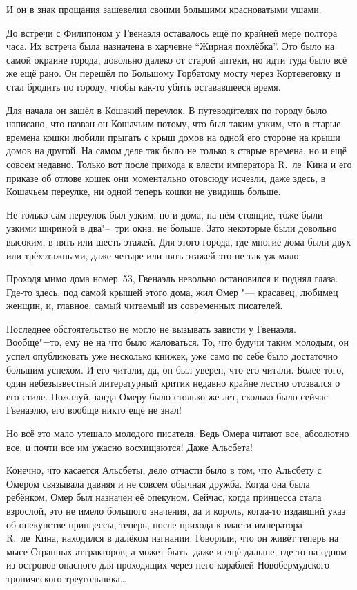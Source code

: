 И он в знак прощания зашевелил своими большими красноватыми ушами.

До встречи с Филипоном у Гвенаэля оставалось ещё по крайней мере полтора часа.
Их встреча была назначена в харчевне \enquote{Жирная похлёбка}.
Это было на самой окраине города, довольно далеко от старой аптеки, но идти туда
было всё же ещё рано.
Он перешёл по Большому Горбатому мосту через Кортевеговку и стал бродить по
городу, чтобы как-то убить остававшееся время.

Для начала он зашёл в Кошачий переулок.
В путеводителях по городу было написано, что назван он Кошачьим потому, что был
таким узким, что в старые времена кошки любили прыгать с крыш домов на одной его
стороне на крыши домов на другой.
На самом деле так было не только в старые времена, но и ещё совсем недавно.
Только вот после прихода к власти императора R.~ле~Кина и его приказе об отлове
кошек они моментально отовсюду исчезли, даже здесь, в Кошачьем переулке, ни
одной теперь кошки не увидишь больше.

Не только сам переулок был узким, но и дома, на нём стоящие, тоже были узкими
шириной в два"--~три окна, не больше.
Зато некоторые были довольно высоким, в пять или шесть этажей.
Для этого города, где многие дома были двух или трёхэтажными, даже четыре или
пять этажей это не так уж мало.

Проходя мимо дома номер~53, Гвенаэль невольно остановился и поднял глаза.
Где-то здесь, под самой крышей этого дома, жил Омер "--- красавец, любимец
женщин, и, главное, самый читаемый из современных писателей.

Последнее обстоятельство не могло не вызывать зависти у Гвенаэля.
Вообще"=то, ему не на что было жаловаться.
То, что будучи таким молодым, он успел опубликовать уже несколько книжек, уже
само по себе было достаточно большим успехом.
И его читали, да, он был уверен, что его читали.
Более того, один небезызвестный литературный критик недавно крайне лестно
отозвался о его стиле.
Пожалуй, когда Омеру было столько же лет, сколько было сейчас Гвенаэлю, его
вообще никто ещё не знал!

Но всё это мало утешало молодого писателя.
Ведь Омера читают все, абсолютно все, и почти все им ужасно восхищаются!
Даже Альсбета!

Конечно, что касается Альсбеты, дело отчасти было в том, что Альсбету с Омером
связывала давняя и не совсем обычная дружба.
Когда она была ребёнком, Омер был назначен её опекуном.
Сейчас, когда принцесса стала взрослой, это не имело большого значения, да и
король, когда-то издавший указ об опекунстве принцессы, теперь, после прихода к
власти императора R.~ле~Кина, находился в далёком изгнании.
Говорили, что он живёт теперь на мысе Странных аттракторов, а может быть, даже и
ещё дальше, где-то на одном из островов опасного для проходящих через него
кораблей Новобермудского тропического треугольника\ldots

